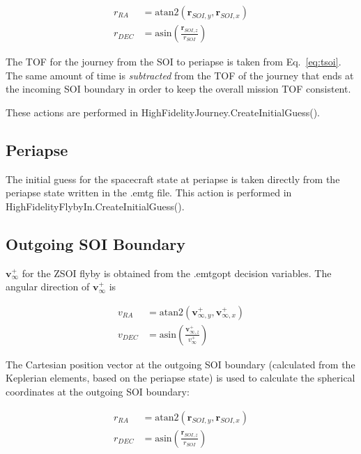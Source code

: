 \documentclass[]{article}
\newcommand{\vb}[1]{\bm{#1}} %
\begin{document}
\begin{align}
r_{RA} &= \mathrm{atan2} \left( \vb{r}_{SOI, y}, \vb{r}_{SOI, x} \right) \\
r_{DEC} &= \mathrm{asin} \left( \frac{\vb{r}_{SOI, z}}{r_{SOI}} \right)
\end{align}

The \ac{TOF} for the journey from the \ac{SOI} to periapse is taken from Eq.~\eqref{eq:tsoi}. The same amount of time is \emph{subtracted} from the \ac{TOF} of the journey that ends at the incoming \ac{SOI} boundary in order to keep the overall mission \ac{TOF} consistent.

These actions are performed in HighFidelityJourney.CreateInitialGuess().

\subsection{Periapse}

The initial guess for the spacecraft state at periapse is taken directly from the periapse state written in the .emtg file. This action is performed in HighFidelityFlybyIn.CreateInitialGuess().

\subsection{Outgoing SOI Boundary}

$\vb{v}_{\infty}^{+}$ for the \ac{ZSOI} flyby is obtained from the .emtgopt decision variables. The angular direction of $\vb{v}_{\infty}^{+}$ is

\begin{align}
v_{RA} &= \mathrm{atan2} \left( \vb{v}_{\infty, y}^{+}, \vb{v}_{\infty, x}^{+} \right) \\
v_{DEC} &= \mathrm{asin} \left( \frac{\vb{v}_{\infty, z}^{+}}{v_{\infty}^{+}} \right)
\end{align}

\noindent The Cartesian position vector at the outgoing \ac{SOI} boundary (calculated from the Keplerian elements, based on the periapse state) is used to calculate the spherical coordinates at the outgoing \ac{SOI} boundary:

\begin{align}
r_{RA} &= \mathrm{atan2} \left( \vb{r}_{SOI, y}, \vb{r}_{SOI, x} \right) \\
r_{DEC} &= \mathrm{asin} \left( \frac{\vb{r}_{SOI, z}}{r_{SOI}} \right)
\end{align}
\end{document}
